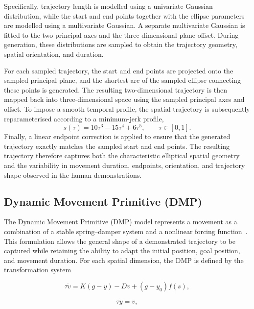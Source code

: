 \documentclass[journal]{IEEEtran}
\begin{document}
Specifically, trajectory length is modelled using a univariate Gaussian distribution, while the start and end points together with the ellipse parameters are modelled using a multivariate Gaussian. A separate multivariate Gaussian is fitted to the two principal axes and the three-dimensional plane offset. During generation, these distributions are sampled to obtain the trajectory geometry, spatial orientation, and duration.

For each sampled trajectory, the start and end points are projected onto the sampled principal plane, and the shortest arc of the sampled ellipse connecting these points is generated. The resulting two-dimensional trajectory is then mapped back into three-dimensional space using the sampled principal axes and offset. To impose a smooth temporal profile, the spatial trajectory is subsequently reparameterised according to a minimum-jerk profile,
\begin{equation}
s(\tau) = 10\tau^3 - 15\tau^4 + 6\tau^5,
\qquad \tau \in [0,1].
\end{equation}
Finally, a linear endpoint correction is applied to ensure that the generated trajectory exactly matches the sampled start and end points. The resulting trajectory therefore captures both the characteristic elliptical spatial geometry and the variability in movement duration, endpoints, orientation, and trajectory shape observed in the human demonstrations.

\subsection{Dynamic Movement Primitive (DMP)}

The Dynamic Movement Primitive (DMP) model represents a movement as a combination of a stable spring--damper system and a nonlinear forcing function~\cite{ijspeert_DynamicalMovementPrimitives_2013}. This formulation allows the general shape of a demonstrated trajectory to be captured while retaining the ability to adapt the initial position, goal position, and movement duration. For each spatial dimension, the DMP is defined by the transformation system

\begin{equation}
\tau \dot{v} = K(g-y)-Dv+(g-y_0)f(s),
\end{equation}

\begin{equation}
\tau \dot{y}=v,
\end{equation}
\end{document}
